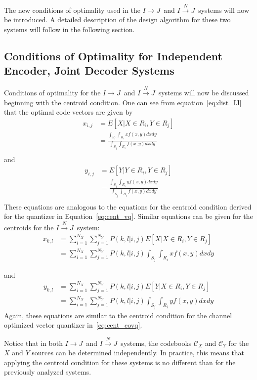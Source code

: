 \documentclass[10pt]{article}
\newcommand{\sysIJN}{\mbox{$I \overset{N}{\rightarrow} J$}}
\newcommand{\sysIJ}{\mbox{$I \rightarrow J$}}
\begin{document}
The new conditions of optimality used in the \sysIJ\ and \sysIJN\ systems will now be introduced. A detailed description of the design algorithm for these two systems will follow in the following section.

\subsection{Conditions of Optimality for Independent Encoder, Joint Decoder Systems}
Conditions of optimality for the \sysIJ\ and \sysIJN\ systems will now be discussed beginning with the centroid condition. One can see from equation~\ref{eq:dist_IJ} that the optimal code vectors are given by
\begin{align}
x_{i,j} &= E[X | X \in R_i, Y \in R_j] \\
&= \frac{ \int_{S_j}\int_{R_i}xf(x,y)dxdy }{ \int_{S_j}\int_{R_i}f(x,y)dxdy } \\
\end{align}
and
\begin{align}
y_{i,j} &= E[Y | Y \in R_i, Y \in R_j] \\
&= \frac{ \int_{S_j}\int_{R_i}yf(x,y)dxdy }{ \int_{S_j}\int_{R_i}f(x,y)dxdy } \\
\end{align}
These equations are analogous to the equations for the centroid condition derived for the quantizer in Equation~\ref{eq:cent_vq}. Similar equations can be given for the centroids for the \sysIJN\ system:
\begin{align}
  x_{k,l} &= \sum_{i=1}^{N_X} \sum_{j=1}^{N_Y} P(k,l|i,j)E[X | X \in R_i, Y \in R_j] \\
  &= \sum_{i=1}^{N_X} \sum_{j=1}^{N_Y} P(k,l|i,j)\int_{S_j} \int_{R_i} xf(x,y)dxdy
\end{align}

and
\begin{align}
  y_{k,l} &= \sum_{i=1}^{N_X} \sum_{j=1}^{N_Y} P(k,l|i,j)E[Y | X \in R_i, Y \in R_j] \\
  &= \sum_{i=1}^{N_X} \sum_{j=1}^{N_Y} P(k,l|i,j)\int_{S_j} \int_{R_i} yf(x,y)dxdy
\end{align}
Again, these equations are similar to the centroid condition for the channel optimized vector quantizer in~\ref{eq:cent_covq}.

Notice that in both \sysIJ\ and \sysIJN\ systems, the codebooks $\mathcal{C}_X$ and $\mathcal{C}_Y$ for the $X$ and $Y$ sources can be determined independently. In practice, this means that applying the centroid condition for these systems is no different than for the previously analyzed systems. 
\end{document}
